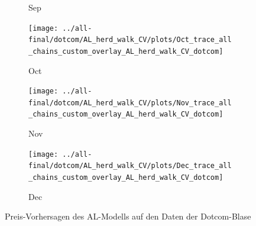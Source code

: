 \documentclass[ngerman]{ttlab-qualify}
\begin{document}
\begin{figure}[H]
\begin{subfigure}{.3\linewidth}
  \caption{Sep}
  \end{subfigure}\par\medskip
  \begin{subfigure}{.3\linewidth}
  \texttt{[image: ../all-final/dotcom/AL\_herd\_walk\_CV/plots/Oct\_trace\_all\_chains\_custom\_overlay\_AL\_herd\_walk\_CV\_dotcom]}\hfill
  \caption{Oct}
  \end{subfigure}
  \begin{subfigure}{.3\linewidth}
  \texttt{[image: ../all-final/dotcom/AL\_herd\_walk\_CV/plots/Nov\_trace\_all\_chains\_custom\_overlay\_AL\_herd\_walk\_CV\_dotcom]}\hfill
  \caption{Nov}
  \end{subfigure}
  \begin{subfigure}{.3\linewidth}
  \texttt{[image: ../all-final/dotcom/AL\_herd\_walk\_CV/plots/Dec\_trace\_all\_chains\_custom\_overlay\_AL\_herd\_walk\_CV\_dotcom]}\hfill
  \caption{Dec}
  \end{subfigure}
  \caption{Preis-Vorhersagen des AL-Modells auf den Daten der Dotcom-Blase}
\end{figure}
\end{document}
